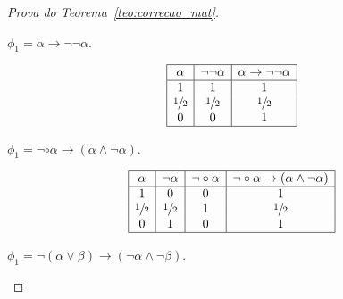 \begin{proof}[Prova do Teorema~\ref{teo:correcao_mat}]
\begin{provaporcasos}
\begin{provaporsubcasos}
                   
                \subcasodeprova{} $\phi_{1} = \alpha \to \neg \neg \alpha$. 
                
                \begin{center}
                    \[
                        \begin{array}{|c|c|c|}%
                            \hline%
                            \alpha      & \neg \neg \alpha &  \alpha \to \neg \neg \alpha\\
                            \hline%
                            1 & 1 & 1\\
                            \meio{} & \meio{} & \meio{}\\
                            0 & 0 & 1\\
                            \hline%
                        \end{array}
                    \]
                \end{center}
                
                   
                \subcasodeprova{} $\phi_{1} = \neg \circ \alpha \to (\alpha \land \neg \alpha)$. 

                \begin{center}
                    \[
                        \begin{array}{|c|c|c|c|}%
                            \hline%
                            \alpha      & \neg \alpha & \neg \circ \alpha & \neg \circ \alpha \to (\alpha \land \neg \alpha)\\
                            \hline%
                            1 & 0 & 0 &1\\
                            \meio{} & \meio{} & 1&\meio{}\\
                            0 & 1 & 0&1\\
                            \hline%
                        \end{array}
                    \]
                \end{center}
               

                \subcasodeprova{} $\phi_{1} = \neg (\alpha \lor \beta) \to (\neg \alpha \land \neg \beta)$. 


\end{provaporsubcasos}
\end{provaporcasos}
\end{proof}
